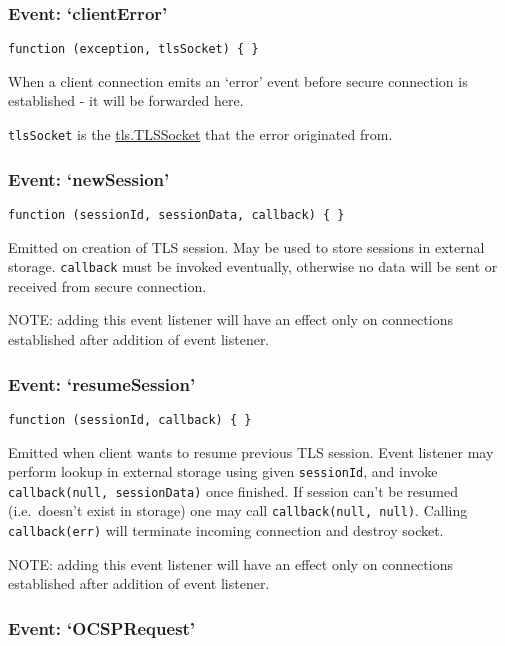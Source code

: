 \subsubsection{\texorpdfstring{Event:
`clientError'}{Event: clientError}}\label{event-clienterror}

\texttt{function\ (exception,\ tlsSocket)\ \{\ \}}

When a client connection emits an `error' event before secure connection
is established - it will be forwarded here.

\texttt{tlsSocket} is the
\hyperref[tlsux5fclassux5ftlsux5ftlssocket]{tls.TLSSocket} that the
error originated from.

\subsubsection{\texorpdfstring{Event:
`newSession'}{Event: newSession}}\label{event-newsession}

\texttt{function\ (sessionId,\ sessionData,\ callback)\ \{\ \}}

Emitted on creation of TLS session. May be used to store sessions in
external storage. \texttt{callback} must be invoked eventually,
otherwise no data will be sent or received from secure connection.

NOTE: adding this event listener will have an effect only on connections
established after addition of event listener.

\subsubsection{\texorpdfstring{Event:
`resumeSession'}{Event: resumeSession}}\label{event-resumesession}

\texttt{function\ (sessionId,\ callback)\ \{\ \}}

Emitted when client wants to resume previous TLS session. Event listener
may perform lookup in external storage using given \texttt{sessionId},
and invoke \texttt{callback(null,\ sessionData)} once finished. If
session can't be resumed (i.e.~doesn't exist in storage) one may call
\texttt{callback(null,\ null)}. Calling \texttt{callback(err)} will
terminate incoming connection and destroy socket.

NOTE: adding this event listener will have an effect only on connections
established after addition of event listener.

\subsubsection{\texorpdfstring{Event:
`OCSPRequest'}{Event: OCSPRequest}}\label{event-ocsprequest}

